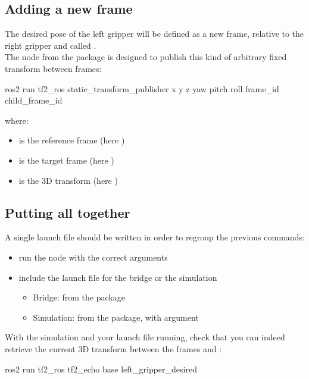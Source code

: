 \documentclass{ecnreport}
\begin{document}
\subsection{Adding a new frame}

The desired pose of the left gripper will be defined as a new frame, relative to the right gripper and called .\\
The node  from the  package is designed to publish this kind of arbitrary fixed transform between frames:
\begin{bashcodelarge}
 ros2 run tf2_ros static_transform_publisher x y z yaw pitch roll frame_id child_frame_id
\end{bashcodelarge}where:
\begin{itemize}
\item {} is the reference frame (here )
\item {} is the target frame (here )
 \item {} is the 3D transform (here )
\end{itemize}

\subsection{Putting all together}

A single launch file should be written in order to regroup the previous commands:
\begin{itemize}
 \item run the node  with the correct arguments
 \item include the launch file for the bridge or the simulation
 \begin{itemize}
  \item Bridge:  from the  package
  \item Simulation:  from the  package, with argument 
 \end{itemize}
 \end{itemize}
 
 With the simulation and your launch file running, check that you can indeed retrieve the current 3D transform between the frames  and :
 \begin{bashcodelarge}
 ros2 run tf2_ros tf2_echo base left_gripper_desired
\end{bashcodelarge}
\end{document}
